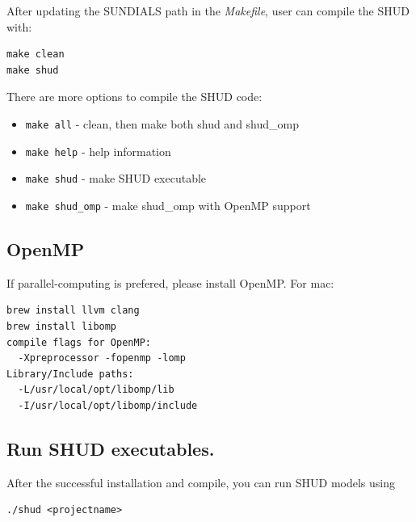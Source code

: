 \documentclass[
]{scrbook}
\providecommand{\tightlist}{%
  \setlength{\itemsep}{0pt}\setlength{\parskip}{0pt}}
\begin{document}
After updating the SUNDIALS path in the \emph{Makefile}, user can compile the SHUD with:

\begin{verbatim}
make clean
make shud
\end{verbatim}

There are more options to compile the SHUD code:

\begin{itemize}
\tightlist
\item
  \texttt{make\ all} - clean, then make both shud and shud\_omp
\item
  \texttt{make\ help} - help information
\item
  \texttt{make\ shud} - make SHUD executable
\item
  \texttt{make\ shud\_omp} - make shud\_omp with OpenMP support
\end{itemize}

\hypertarget{openmp}{%
\subsection{OpenMP}\label{openmp}}

If parallel-computing is prefered, please install OpenMP. For mac:

\begin{verbatim}
brew install llvm clang
brew install libomp
compile flags for OpenMP: 
  -Xpreprocessor -fopenmp -lomp
Library/Include paths:
  -L/usr/local/opt/libomp/lib 
  -I/usr/local/opt/libomp/include
\end{verbatim}

\hypertarget{run-shud-executables.}{%
\subsection{Run SHUD executables.}\label{run-shud-executables.}}

After the successful installation and compile, you can run SHUD models using

\begin{verbatim}
./shud <projectname>
\end{verbatim}
\end{document}
